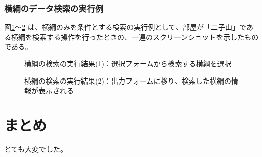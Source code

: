 \documentclass[10pt,a4paper,titlepage]{jreport}
\begin{document}
\subsection{横綱のデータ検索の実行例}


図\ref{fig:yokozuna_search1}～\ref{fig:yokozuna_search2} は、横綱のみを条件とする検索の実行例として、部屋が「二子山」である横綱を検索する操作を行ったときの、一連のスクリーンショットを示したものである。\\

\begin{figure}[h]
	\begin{center}
	\end{center}
	\caption{横綱の検索の実行結果(1)：選択フォームから検索する横綱を選択
	}
	\label{fig:yokozuna_search1}
\end{figure}

\begin{figure}[h]
	\begin{center}
	\end{center}
	\caption{横綱の検索の実行結果(2)：出力フォームに移り、検索した横綱の情報が表示される
	}
	\label{fig:yokozuna_search2}
\end{figure}


\chapter{まとめ}

とても大変でした。
\end{document}
